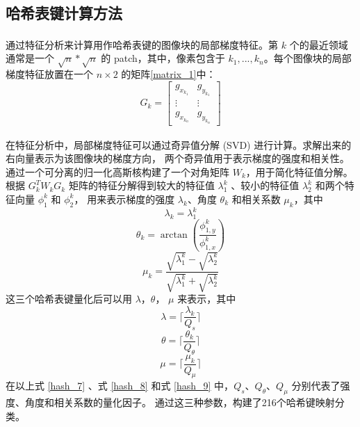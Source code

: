 \documentclass[12pt, a4paper, oneside]{ctexbook}
\begin{document}
	\subsection{哈希表键计算方法}
	通过特征分析\textsuperscript{\cite{6}}来计算用作哈希表键的图像块的局部梯度特征。第 $k$ 个的最近领域通常是一个 $\sqrt{n}*\sqrt{n}$ 的 patch，其中，像素包含于 $k_1,...,k_n$。每个图像块的局部梯度特征放置在一个 $n \times 2$ 的矩阵\ref{matrix_1}中：
	\begin{equation}
	G_k=
	\left[
	\begin{matrix}
		{g_{x_{k_1}}} & {g_{y_{k_1}}}\\
		\vdots & \vdots\\
		{g_{x_{k_n}}} & {g_{y_{k_n}}}
	\end{matrix}
	\right]\label{matrix_1}
	\end{equation}
	\par 在特征分析\textsuperscript{\cite{6}}中，局部梯度特征可以通过奇异值分解 (SVD) 进行计算。求解出来的右向量表示为该图像块的梯度方向，
	两个奇异值用于表示梯度的强度和相关性。通过一个可分离的归一化高斯核构建了一个对角矩阵 $W_k$，用于简化特征值分解。
	根据 $G_k^TW_kG_k$ 矩阵的特征分解得到较大的特征值 $\lambda_1^k$ 、较小的特征值 $\lambda_2^k$ 和两个特征向量 $\phi_1^k$ 和 $\phi_2^k$，
	用来表示梯度的强度 $\lambda_k$、角度 $\theta_k$ 和相关系数 $\mu_k$，其中
	\begin{equation}
		\lambda_k=\lambda_1^k
	\end{equation}
	\begin{equation}
		\theta_k=\arctan(\frac{\phi_{1,y}^k}{\phi_{1,x}^k}) 
	\end{equation}
	\begin{equation}
		\mu_k=\frac{\sqrt{\lambda_1^k}-\sqrt{\lambda_2^k}}{\sqrt{\lambda_1^k}+\sqrt{\lambda_2^k}} 
	\end{equation}
	这三个哈希表键量化后可以用 $\lambda$，$\theta$， $\mu$ 来表示，其中
	\begin{equation}
		\lambda=\lceil\frac{\lambda_k}{Q_s}\rceil		\label{hash_7}
	\end{equation}
	\begin{equation}
		\theta=\lceil\frac{\theta_k}{Q_\theta}\rceil	\label{hash_8}
	\end{equation}
	\begin{equation}
		\mu=\lceil\frac{\mu_k}{Q_\mu}\rceil				\label{hash_9}
	\end{equation}
	在以上式 \ref{hash_7} 、式 \ref{hash_8} 和式 \ref{hash_9} 中，$Q_s$、$Q_\theta$、$Q_\mu$ 分别代表了强度、角度和相关系数的量化因子。
	通过这三种参数，构建了216个哈希键映射分类。
	
\end{document}
